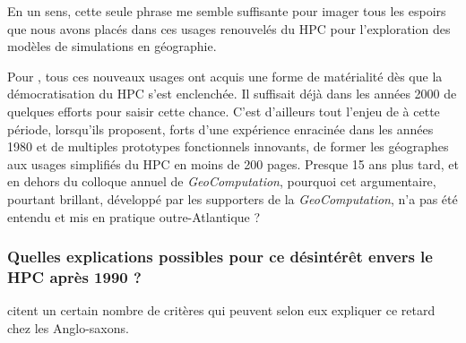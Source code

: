 En un sens, cette seule phrase me semble suffisante pour imager tous les espoirs que nous avons placés dans ces usages renouvelés du HPC pour l'exploration des modèles de simulations en géographie.

Pour \textcite{Openshaw2000}, tous ces nouveaux usages ont acquis une forme de matérialité dès que la démocratisation du HPC s'est enclenchée. Il suffisait déjà dans les années 2000 de quelques efforts pour saisir cette chance. C'est d'ailleurs tout l'enjeu de \textcite{Turton1998} à cette période, lorsqu'ils proposent, forts d'une expérience enracinée dans les années 1980 et de multiples prototypes fonctionnels innovants, de former les géographes aux usages simplifiés du HPC en moins de 200 pages. Presque 15 ans plus tard, et en dehors du colloque annuel de \textit{GeoComputation}, pourquoi cet argumentaire, pourtant brillant, développé par les supporters de la \textit{GeoComputation}, n'a pas été entendu et mis en pratique outre-Atlantique ?



\subsubsection{Quelles explications possibles pour ce désintérêt envers le HPC après 1990 ? }
\label{sssec:desertionHPC}

\textcite[20-22]{Openshaw2000} citent un certain nombre de critères qui peuvent selon eux expliquer ce retard chez les Anglo-saxons.

